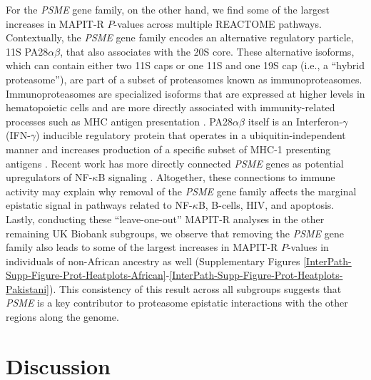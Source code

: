 \documentclass[10pt,a4paper]{article}
\begin{document}
For the \textit{PSME} gene family, on the other hand, we find some of the largest increases in MAPIT-R $P$-values across multiple REACTOME pathways. Contextually, the \textit{PSME} gene family encodes an alternative regulatory particle, 11S PA28$\alpha\beta$, that also associates with the 20S core. These alternative isoforms, which can contain either two 11S caps or one 11S and one 19S cap (i.e., a ``hybrid proteasome''), are part of a subset of proteasomes known as immunoproteasomes. Immunoproteasomes are specialized isoforms that are expressed at higher levels in hematopoietic cells and are more directly associated with immunity-related processes such as MHC antigen presentation \cite{Ferrington2012,Basler2013,McCarthy2015}. PA28$\alpha\beta$ itself is an Interferon-$\gamma$ (IFN-$\gamma$) inducible regulatory protein that operates in a ubiquitin-independent manner and increases production of a specific subset of MHC-1 presenting antigens \cite{Groettrup1996,de2011,Raule2014,Murata2018}. Recent work has more directly connected \textit{PSME} genes as potential upregulators of NF-$\kappa$B signaling \cite{Sun2016,Mitchell2019}. Altogether, these connections to immune activity may explain why removal of the \textit{PSME} gene family affects the marginal epistatic signal in pathways related to NF-$\kappa$B, B-cells, HIV, and apoptosis. Lastly, conducting these ``leave-one-out'' MAPIT-R analyses in the other remaining UK Biobank subgroups, we observe that removing the \textit{PSME} gene family also leads to some of the largest increases in MAPIT-R $P$-values in individuals of non-African ancestry as well (Supplementary Figures \ref{InterPath-Supp-Figure-Prot-Heatplots-African}-\ref{InterPath-Supp-Figure-Prot-Heatplots-Pakistani}). This consistency of this result across all subgroups suggests that \textit{PSME} is a key contributor to proteasome epistatic interactions with the other regions along the genome. 

\section*{Discussion}\label{InterPath-Discussion}
\end{document}
